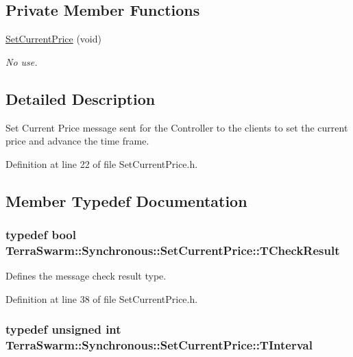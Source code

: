 \subsection*{Private Member Functions}
\begin{DoxyCompactItemize}
\item 
\hyperlink{class_terra_swarm_1_1_synchronous_1_1_set_current_price_a1d8f82415c6d84a85176ee9f233288dd}{Set\-Current\-Price} (void)
\begin{DoxyCompactList}\small\item\em No use. \end{DoxyCompactList}\end{DoxyCompactItemize}


\subsection{Detailed Description}
Set Current Price message sent for the Controller to the clients to set the current price and advance the time frame. 

Definition at line 22 of file Set\-Current\-Price.\-h.



\subsection{Member Typedef Documentation}
\hypertarget{class_terra_swarm_1_1_synchronous_1_1_set_current_price_aeed4ef4c867719626ede15e2f8718436}{
\subsubsection[{T\-Check\-Result}]{\setlength{\rightskip}{0pt plus 5cm}typedef bool {\bf Terra\-Swarm\-::\-Synchronous\-::\-Set\-Current\-Price\-::\-T\-Check\-Result}}}\label{class_terra_swarm_1_1_synchronous_1_1_set_current_price_aeed4ef4c867719626ede15e2f8718436}


Defines the message check result type. 



Definition at line 38 of file Set\-Current\-Price.\-h.

\hypertarget{class_terra_swarm_1_1_synchronous_1_1_set_current_price_aa87902078a0788d13ef70b899d83f4d3}{
\subsubsection[{T\-Interval}]{\setlength{\rightskip}{0pt plus 5cm}typedef unsigned int {\bf Terra\-Swarm\-::\-Synchronous\-::\-Set\-Current\-Price\-::\-T\-Interval}}}\label{class_terra_swarm_1_1_synchronous_1_1_set_current_price_aa87902078a0788d13ef70b899d83f4d3}


